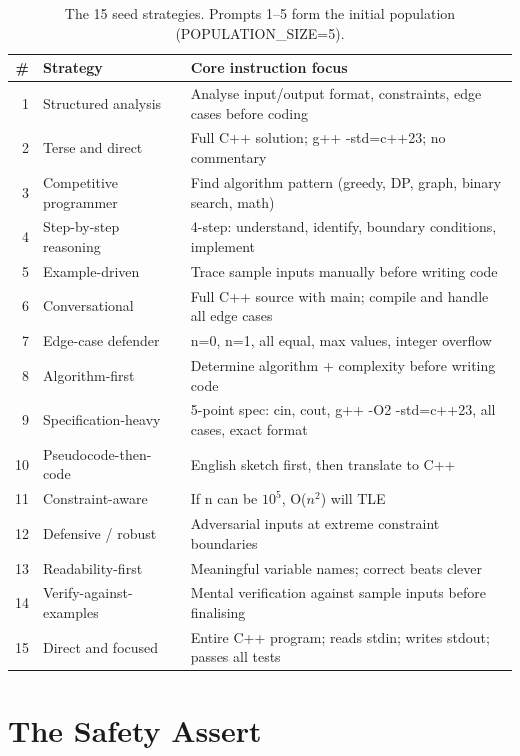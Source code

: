 \documentclass[11pt,a4paper]{report}
\begin{document}
\begin{table}[h]
\centering
\begin{tabular}{@{}rp{3.2cm}p{7.8cm}@{}}
\toprule
\textbf{\#} & \textbf{Strategy} & \textbf{Core instruction focus} \\
\midrule
1  & Structured analysis     & Analyse input/output format, constraints, edge cases before coding \\
2  & Terse and direct        & Full C++ solution; g++ -std=c++23; no commentary \\
3  & Competitive programmer  & Find algorithm pattern (greedy, DP, graph, binary search, math) \\
4  & Step-by-step reasoning  & 4-step: understand, identify, boundary conditions, implement \\
5  & Example-driven          & Trace sample inputs manually before writing code \\
6  & Conversational          & Full C++ source with main; compile and handle all edge cases \\
7  & Edge-case defender      & n=0, n=1, all equal, max values, integer overflow \\
8  & Algorithm-first         & Determine algorithm + complexity before writing code \\
9  & Specification-heavy     & 5-point spec: cin, cout, g++ -O2 -std=c++23, all cases, exact format \\
10 & Pseudocode-then-code    & English sketch first, then translate to C++ \\
11 & Constraint-aware        & If n can be $10^5$, O($n^2$) will TLE \\
12 & Defensive / robust      & Adversarial inputs at extreme constraint boundaries \\
13 & Readability-first       & Meaningful variable names; correct beats clever \\
14 & Verify-against-examples & Mental verification against sample inputs before finalising \\
15 & Direct and focused      & Entire C++ program; reads stdin; writes stdout; passes all tests \\
\bottomrule
\end{tabular}
\caption{The 15 seed strategies. Prompts 1--5 form the initial population (POPULATION\_SIZE=5).}
\end{table}

\section{The Safety Assert}
\end{document}
